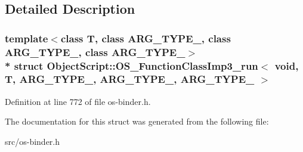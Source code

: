 \subsection{Detailed Description}
\subsubsection*{template$<$class T, class A\+R\+G\+\_\+\+T\+Y\+P\+E\+\_, class A\+R\+G\+\_\+\+T\+Y\+P\+E\+\_, class A\+R\+G\+\_\+\+T\+Y\+P\+E\+\_$>$\\*
struct Object\+Script\+::\+O\+S\+\_\+\+Function\+Class\+Imp3\+\_\+run$<$ void, T,   A\+R\+G\+\_\+\+T\+Y\+P\+E\+\_, A\+R\+G\+\_\+\+T\+Y\+P\+E\+\_, A\+R\+G\+\_\+\+T\+Y\+P\+E\+\_ $>$}



Definition at line 772 of file os-\/binder.\+h.



The documentation for this struct was generated from the following file\+:\begin{DoxyCompactItemize}
\item 
src/os-\/binder.\+h\end{DoxyCompactItemize}
